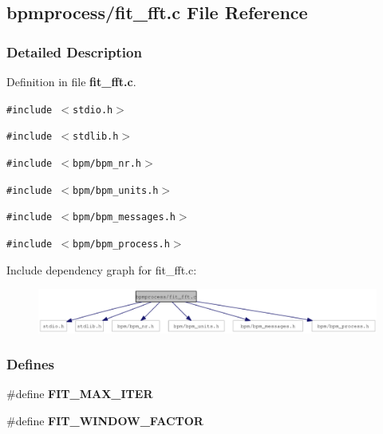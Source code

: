 \subsection{bpmprocess/fit\_\-fft.c File Reference}
\label{fit__fft_8c}


\subsubsection{Detailed Description}


Definition in file {\bf fit\_\-fft.c}.

{\tt \#include $<$stdio.h$>$}\par
{\tt \#include $<$stdlib.h$>$}\par
{\tt \#include $<$bpm/bpm\_\-nr.h$>$}\par
{\tt \#include $<$bpm/bpm\_\-units.h$>$}\par
{\tt \#include $<$bpm/bpm\_\-messages.h$>$}\par
{\tt \#include $<$bpm/bpm\_\-process.h$>$}\par


Include dependency graph for fit\_\-fft.c:\nopagebreak
\begin{figure}[H]
\begin{center}
\leavevmode
\includegraphics[width=353pt]{fit__fft_8c__incl}
\end{center}
\end{figure}
\subsubsection*{Defines}
\begin{CompactItemize}
\item 
\#define \textbf{FIT\_\-MAX\_\-ITER}\label{fit__fft_8c_2181690e4757168cb4ff93594aa86a51}

\item 
\#define \textbf{FIT\_\-WINDOW\_\-FACTOR}\label{fit__fft_8c_59cb4ea26e39cdfcd7398d07297d6e08}

\end{CompactItemize}
